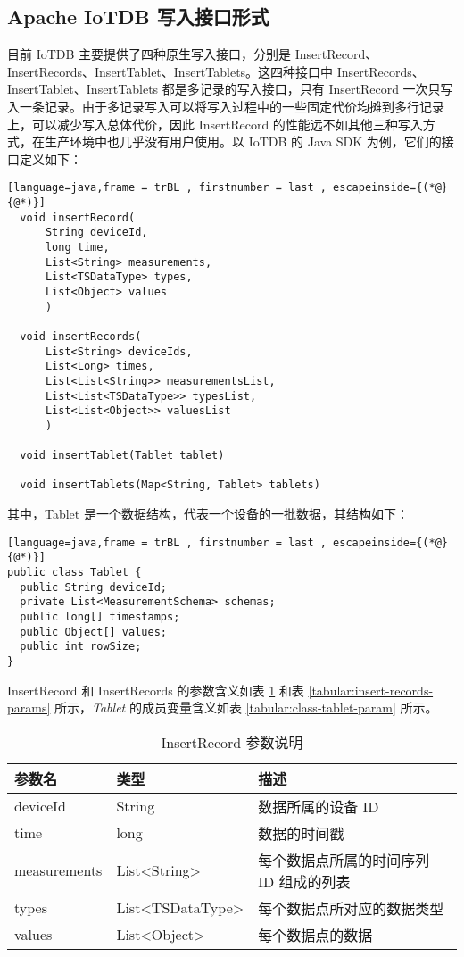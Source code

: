 \subsection{Apache IoTDB 写入接口形式}
目前 IoTDB 主要提供了四种原生写入接口，分别是 InsertRecord、InsertRecords、InsertTablet、InsertTablets。这四种接口中 InsertRecords、InsertTablet、InsertTablets 都是多记录的写入接口，只有 InsertRecord 一次只写入一条记录。由于多记录写入可以将写入过程中的一些固定代价均摊到多行记录上，可以减少写入总体代价\cite{bercken2001evaluation}，因此 InsertRecord 的性能远不如其他三种写入方式，在生产环境中也几乎没有用户使用。以 IoTDB 的 Java SDK 为例，它们的接口定义如下：
\begin{lstlisting}[language=java,frame = trBL , firstnumber = last , escapeinside={(*@}{@*)}]
  void insertRecord(
      String deviceId,
      long time,
      List<String> measurements,
      List<TSDataType> types,
      List<Object> values
      )

  void insertRecords(
      List<String> deviceIds, 
      List<Long> times, 
      List<List<String>> measurementsList, 
      List<List<TSDataType>> typesList, 
      List<List<Object>> valuesList
      )

  void insertTablet(Tablet tablet)

  void insertTablets(Map<String, Tablet> tablets)
\end{lstlisting}
其中，Tablet 是一个数据结构，代表一个设备的一批数据，其结构如下：
\begin{lstlisting}[language=java,frame = trBL , firstnumber = last , escapeinside={(*@}{@*)}]
public class Tablet {
  public String deviceId;
  private List<MeasurementSchema> schemas;
  public long[] timestamps;
  public Object[] values;
  public int rowSize;
}
\end{lstlisting}
InsertRecord 和 InsertRecords 的参数含义如表 \ref{tabular:insert-record-params} 和表 \ref{tabular:insert-records-params} 所示，\emph{Tablet} 的成员变量含义如表 \ref{tabular:class-tablet-param} 所示。
\begin{table}
  \centering
  \caption{InsertRecord 参数说明}
  \begin{tabular}{lll}
    \toprule
    参数名 &  类型 & 描述 \\
    \midrule
    deviceId & String & 数据所属的设备 ID \\
    time & long & 数据的时间戳 \\
    measurements & List<String> & 每个数据点所属的时间序列 ID 组成的列表 \\
    types & List<TSDataType> & 每个数据点所对应的数据类型 \\
    values & List<Object> & 每个数据点的数据 \\
    \bottomrule
  \end{tabular}
  \label{tabular:insert-record-params}
\end{table}

